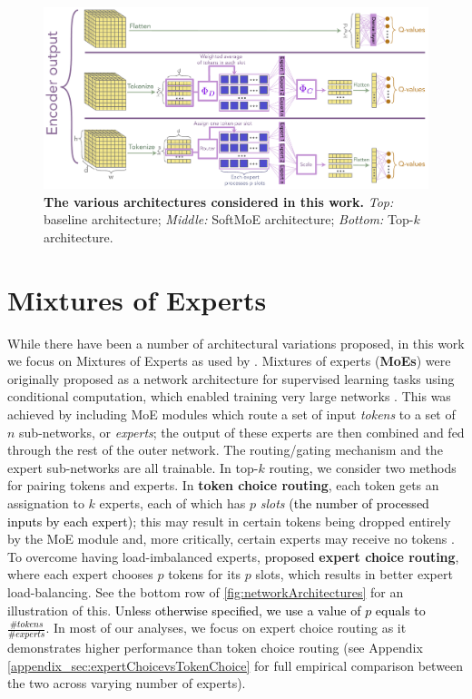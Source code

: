 \documentclass{article} %
\newcommand{\rebuttal}[1]{\textcolor{black}{#1}}
\begin{document}
\begin{figure}[!t]
    \centering
    \includegraphics[width=\textwidth]{figures/architectures.pdf}
    \caption{\textbf{The various architectures considered in this work.} {\it Top:} baseline architecture; {\it Middle:} SoftMoE architecture; {\it Bottom:} Top-$k$ architecture.}
    \label{fig:networkArchitectures}
\end{figure}
\section{Mixtures of Experts}
\label{sec:moes}
While there have been a number of architectural variations proposed, in this work we focus on Mixtures of Experts as used by \citet{ceron2024mixtures}. Mixtures of experts ({\bf MoEs}) were originally proposed as a network architecture for supervised learning tasks using conditional computation, which enabled training very large networks \citep{shazeer2017outrageously,fedus2022switch}. This was achieved by including MoE modules which route a set of input {\em tokens} to a set of $n$ sub-networks, or {\em experts}; the output of these experts are then combined and fed through the rest of the outer network. The routing/gating mechanism and the expert sub-networks are all trainable. In top-$k$ routing, we consider two methods for pairing tokens and experts. In {\bf token choice routing}, each token gets an assignation to $k$ experts, each of which has $p$ {\em slots} \rebuttal{(the number of processed inputs by each expert)}; this may result in certain tokens being dropped entirely by the MoE module and, more critically, certain experts may receive no tokens \citep{gale2023megablocks}. To overcome having load-imbalanced experts, \citet{zhou2022mixture} \rebuttal{proposed} {\bf expert choice routing}, where each expert chooses $p$ tokens for its $p$ slots, which results in better expert load-balancing. See the bottom row of \autoref{fig:networkArchitectures} for an illustration of this. \rebuttal{Unless otherwise specified, we use a value of $p$ equals to $\frac{\#tokens}{\#experts}$}. In most of our analyses, we focus on expert choice routing as it demonstrates higher performance than token choice routing (see Appendix \ref{appendix_sec:expertChoicevsTokenChoice} for full empirical comparison between the two across varying number of experts).
\end{document}
